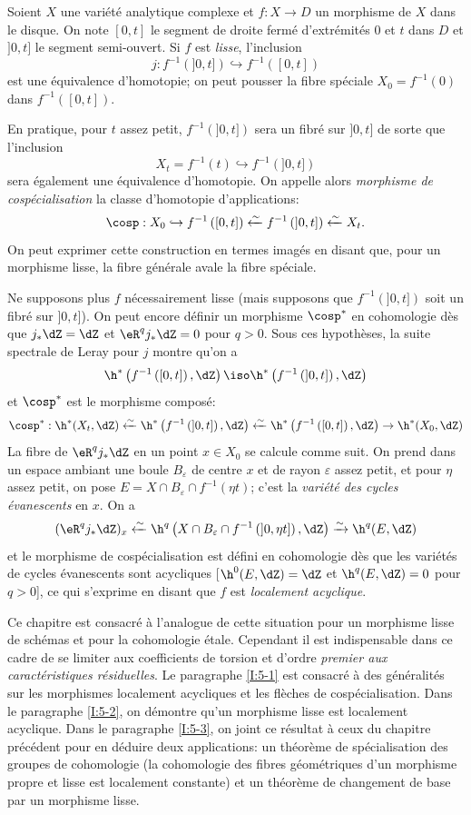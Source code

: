 Soient $X$ une variété analytique complexe et $f:X\to D$ un morphisme de 
$X$ dans le disque. On note $[0,t]$ le segment de droite fermé d'extrémités 
$0$ et $t$ dans $D$ et $]0,t]$ le segment semi-ouvert. Si $f$ est \emph{lisse}, 
l'inclusion 
\[
  j : f^{-1}\left(]0,t]\right) \hookrightarrow f^{-1}\left([0,t]\right)
\]
est une équivalence d'homotopie; on peut pousser la fibre spéciale 
$X_0=f^{-1}(0)$ dans $f^{-1}([0,t])$. 

En pratique, pour $t$ assez petit, $f^{-1}(]0,t])$ sera un fibré sur 
$]0,t]$ de sorte que l'inclusion 
\[
  X_t = f^{-1}(t) \hookrightarrow f^{-1}\left(]0,t]\right)
\]
sera également une équivalence d'homotopie. On appelle alors \emph{morphisme 
de cospécialisation} la classe d'homotopie d'applications: 
\[
  \cosp : X_0 \hookrightarrow f^{-1}\left([0,t]\right) \xleftarrow\sim f^{-1}\left(]0,t]\right) \xleftarrow\sim X_t \text{.}
\]
On peut exprimer cette construction en termes imagés en disant que, pour un 
morphisme lisse, la fibre générale avale la fibre spéciale. 

Ne supposons plus $f$ nécessairement lisse (mais supposons que $f^{-1}(]0,t])$ 
soit un fibré sur $]0,t]$). On peut encore définir un morphisme 
$\cosp^*$ en cohomologie dès que $j_* \dZ=\dZ$ et 
$\eR^q j_* \dZ = 0$ pour $q>0$. Sous ces hypothèses, la suite spectrale de 
Leray pour $j$ montre qu'on a 
\[
  \h^*\left(f^{-1}\left([0,t]\right),\dZ\right) \iso \h^*\left(f^{-1}\left(]0,t]\right),\dZ\right)
\]
et $\cosp^*$ est le morphisme composé: 
\[
  \cosp^* : \h^*(X_t,\dZ)
    \xleftarrow\sim \h^*\left(f^{-1}\left(]0,t]\right),\dZ\right) 
    \xleftarrow\sim \h^*\left(f^{-1}\left([0,t]\right),\dZ\right) 
    \to \h^*(X_0,\dZ)
\]
La fibre de $\eR^q j_* \dZ$ en un point $x\in X_0$ se calcule comme suit. On 
prend dans un espace ambiant une boule $B_\varepsilon$ de centre $x$ et de rayon 
$\varepsilon$ assez petit, et pour $\eta$ assez petit, on pose 
$E=X\cap B_\varepsilon \cap f^{-1}(\eta t)$; c'est la \emph{variété des 
cycles évanescents} en $x$. On a 
\[
  (\eR^q j_* \dZ)_x \xleftarrow\sim \h^q\left(X\cap B_\varepsilon\cap f^{-1}\left(]0,\eta t]\right),\dZ\right) \xrightarrow\sim \h^q(E,\dZ)
\]
et le morphisme de cospécialisation est défini en cohomologie dès que les 
variétés de cycles évanescents sont acycliques [$\h^0(E,\dZ)=\dZ$ et 
$\h^q(E,\dZ) = 0$ pour $q>0$], ce qui s'exprime en disant que $f$ est 
\emph{localement acyclique}. 

Ce chapitre est consacré à l'analogue de cette situation pour un morphisme 
lisse de schémas et pour la cohomologie étale. Cependant il est indispensable 
dans ce cadre de se limiter aux coefficients de torsion et d'ordre \emph{premier aux caractéristiques résiduelles}. Le paragraphe \ref{I:5-1} est consacré 
à des généralités sur les morphismes localement acycliques et les 
flèches de cospécialisation. Dans le paragraphe \ref{I:5-2}, on démontre 
qu'un morphisme lisse est localement acyclique. Dans le paragraphe \ref{I:5-3}, on 
joint ce résultat à ceux du chapitre précédent pour en déduire deux 
applications: un théorème de spécialisation des groupes de cohomologie (la 
cohomologie des fibres géométriques d'un morphisme propre et lisse est 
localement constante) et un théorème de changement de base par un morphisme 
lisse. 

